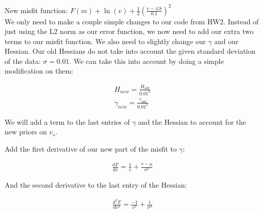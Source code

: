 \documentclass[11pt]{article}
\begin{document}
New misfit function: $F(m) + \ln(v) + \frac{1}{2}(\frac{v-4.8}{0.1})^2$ \\

We only need to make a couple simple changes to our code from HW2.  Instead of just using the L2 norm as our error function, we now need to add our extra two terms to our misfit function.  We also need to slightly change our $\gamma$ and our Hessian.  Our old Hessians do not take into account the given standard deviation of the data: $\sigma=0.01$.  We can take this into account by doing a simple modification on them:

\begin{eqnarray*}
H_{new} = \frac{H_{old}}{0.01^2} \\
\gamma_{new} = \frac{\gamma_{old}}{0.01^2}
\end{eqnarray*}

We will add a term to the last entries of $\gamma$ and the Hessian to account for the new priors on $v_s$.

Add the first derivative of our new part of the misfit to $\gamma$:

\begin{eqnarray*}
\frac{dF}{dv} = \frac{1}{v} + \frac{v-\mu}{\sigma^2}
\end{eqnarray*}

And the second derivative to the last entry of the Hessian:

\begin{eqnarray*}
\frac{d^2F}{dv^2} = \frac{-1}{v^2} + \frac{1}{\sigma^2}
\end{eqnarray*}
\end{document}
